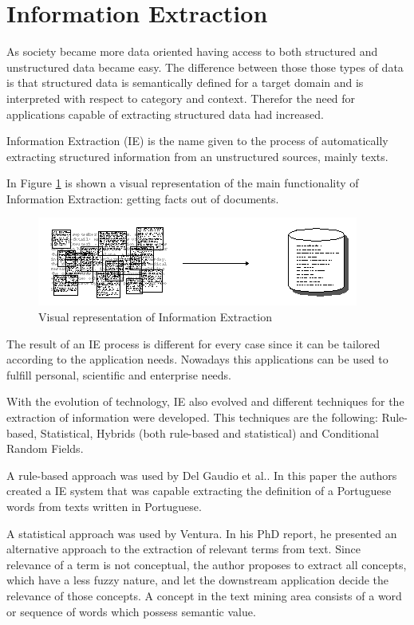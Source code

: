 \section{Information Extraction}

As society became more data oriented having access to both structured and unstructured data became easy.
The difference between those those types of data is that structured data is semantically defined for a target domain and is interpreted with respect to category and context.
Therefor the need for applications capable of extracting structured data had increased.

Information Extraction (IE) is the name given to the process of automatically extracting structured information from an unstructured sources, mainly texts.

In Figure \ref{fig:iext} is shown a visual representation of the main functionality of Information Extraction: getting facts out of documents.
\begin{figure}[H]
\centering
\includegraphics[scale=0.65]{ch2/assets/extract.png}
    \caption[InformationExtraction]{Visual representation of Information Extraction\cite{gate2019}}
\label{fig:iext}
\end{figure}

The result of an IE process is different for every case since it can be tailored according to the application needs.
Nowadays this applications can be used to fulfill personal, scientific and enterprise needs.

With the evolution of technology, IE also evolved and different techniques for the extraction of information were developed.
This techniques are the following: Rule-based, Statistical, Hybrids (both rule-based and statistical) and Conditional Random Fields\cite{sarawagi2008information}.

A rule-based approach was used by Del Gaudio et al.\cite{del2007automatic}.
In this paper the authors created a IE system that was capable extracting the definition of a Portuguese words from texts written in Portuguese.

A statistical approach was used by Ventura\cite{ventura2014automatic}.
In his PhD report, he presented an alternative approach to the extraction of relevant terms from text.
Since relevance of a term is not conceptual, the author proposes to extract all concepts, which have a less fuzzy nature, and let the downstream application decide the relevance of those concepts.
A concept in the text mining area consists of a word or sequence of words which possess semantic value.

